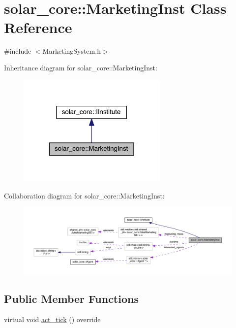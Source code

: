 \hypertarget{classsolar__core_1_1_marketing_inst}{}\section{solar\+\_\+core\+:\+:Marketing\+Inst Class Reference}
\label{classsolar__core_1_1_marketing_inst}


{\ttfamily \#include $<$Marketing\+System.\+h$>$}



Inheritance diagram for solar\+\_\+core\+:\+:Marketing\+Inst\+:
\nopagebreak
\begin{figure}[H]
\begin{center}
\leavevmode
\includegraphics[width=208pt]{classsolar__core_1_1_marketing_inst__inherit__graph}
\end{center}
\end{figure}


Collaboration diagram for solar\+\_\+core\+:\+:Marketing\+Inst\+:
\nopagebreak
\begin{figure}[H]
\begin{center}
\leavevmode
\includegraphics[width=350pt]{classsolar__core_1_1_marketing_inst__coll__graph}
\end{center}
\end{figure}
\subsection*{Public Member Functions}
\begin{DoxyCompactItemize}
\item 
virtual void \hyperlink{classsolar__core_1_1_marketing_inst_a6ad2e259f3ea536cee2c744ac177d470}{act\+\_\+tick} () override
\end{DoxyCompactItemize}
